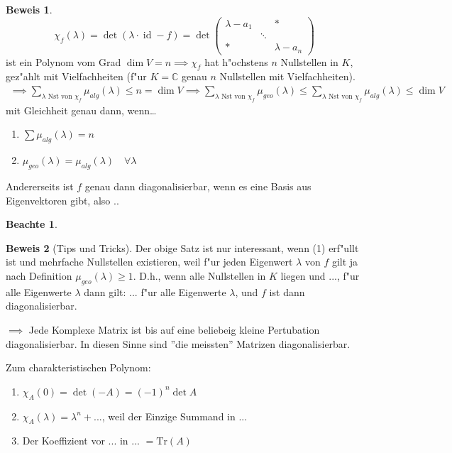 \documentclass[fontsize=11pt,paper=a4,BCOR=0mm,DIV=11,automark,headsepline]{scrbook}
\DeclareMathOperator{\mId}{id}
\theoremstyle{remark}
\theoremstyle{definition}
\newtheorem*{notte}{Beachte}
\theoremstyle{proof}
\newtheorem*{prof}{Beweis}
\theoremstyle{remark}
\begin{document}
\begin{prof}
  \[\chi_f(\lambda) = \det(\lambda\cdot\mId - f) = \det
    \begin{pmatrix}
      \lambda - a_1 & & * \\
      & \ddots & \\
      * & & \lambda - a_n
    \end{pmatrix}
  \] ist ein Polynom vom Grad $\dim V = n \implies \chi_f$ hat h"ochstens $n$ Nullstellen in $K$, gez"ahlt mit Vielfachheiten (f"ur \(K = \mathbb{C}\) genau \(n\) Nullstellen mit Vielfachheiten).
  \begin{align*}
    \implies \sum_{\lambda \text{ Nst von } \chi_f}\mu_{alg}(\lambda) \leq n = \dim V \implies \sum_{\lambda\text{ Nst von }\chi_f} \mu_{geo}(\lambda) \leq \sum_{\lambda\text{ Nst von }\chi_f}\mu_{alg}(\lambda) \leq \dim V
  \end{align*}
  mit Gleichheit genau dann, wenn\dots
  \begin{enumerate}
  \item \(\sum\mu_{alg}(\lambda) = n\)
  \item \(\mu_{geo}(\lambda) = \mu_{alg}(\lambda) \quad\forall\lambda\)
  \end{enumerate}

  Andererseits ist $f$ genau dann diagonalisierbar, wenn es eine Basis aus
  Eigenvektoren gibt, also ..
\end{prof}

\begin{notte}
  \begin{prof}[Tips und Tricks]
    Der obige Satz ist nur interessant, wenn (1) erf"ullt ist und mehrfache
    Nullstellen existieren, weil f"ur jeden Eigenwert $\lambda$ von $f$ gilt ja
    nach Definition $\mu_{geo}(\lambda)\geq 1$. D.h., wenn alle Nullstellen in
    $K$ liegen und ..., f"ur alle Eigenwerte $\lambda$ dann gilt: ... f"ur alle
    Eigenwerte $\lambda$, und $f$ ist dann diagonalisierbar.

    $\implies$ Jede Komplexe Matrix ist bis auf eine beliebeig kleine
    Pertubation diagonalisierbar. In diesen Sinne sind ''die meissten'' Matrizen diagonalisierbar.
  \end{prof}
\end{notte}

Zum charakteristischen Polynom:
\begin{relation}
  \begin{enumerate}
  \item $\chi_A(0) = \det (-A) = (-1)^n \det A$
  \item $\chi_A (\lambda) = \lambda^n + ...$, weil der Einzige Summand in ...
  \item Der Koeffizient vor ... in ... \(=\text{Tr}(A)\)
  \end{enumerate}
\end{relation}
\end{document}
